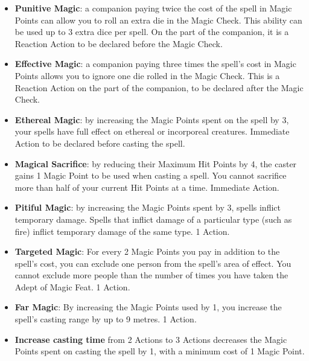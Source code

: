 \documentclass[landscape,10pt,a4paper]{article}
\begin{document}
\begin{multicols}{2}
\begin{dmbox}[title=Alter Magic - page \pageref{altering spells}]
\begin{itemize}[leftmargin=0.5cm,itemsep=-1pt,parsep=0pt]

\item \textbf{Punitive Magic}: a companion paying twice the cost of the spell in Magic Points can allow you to roll an extra die in the Magic Check. This ability can be used up to 3 extra dice per spell. On the part of the companion, it is a Reaction Action to be declared before the Magic Check.

\item \textbf{Effective Magic}: a companion paying three times the spell's cost in Magic Points allows you to ignore one die rolled in the Magic Check. This is a Reaction Action on the part of the companion, to be declared after the Magic Check.

\item \textbf{Ethereal Magic}: by increasing the Magic Points spent on the spell by 3, your spells have full effect on ethereal or incorporeal creatures. Immediate Action to be declared before casting the spell.

\item \textbf{Magical Sacrifice}: by reducing their Maximum Hit Points by 4, the caster gains 1 Magic Point to be used when casting a spell. You cannot sacrifice more than half of your current Hit Points at a time. Immediate Action.

\item \textbf{Pitiful Magic}: by increasing the Magic Points spent by 3, spells inflict temporary damage.
Spells that inflict damage of a particular type (such as fire) inflict temporary damage of the same type. 1 Action.

\item \textbf{Targeted Magic}: For every 2 Magic Points you pay in addition to the spell's cost, you can exclude one person from the spell's area of effect. You cannot exclude more people than the number of times you have taken the Adept of Magic Feat. 1 Action. %

\item \textbf{Far Magic}: By increasing the Magic Points used by 1, you increase the spell's casting range by up to 9 metres. 1 Action.

\item \textbf{Increase casting time} from 2 Actions to 3 Actions decreases the Magic Points spent on casting the spell by 1, with a minimum cost of 1 Magic Point.


\end{itemize}
\end{dmbox}
\end{multicols}
\end{document}
